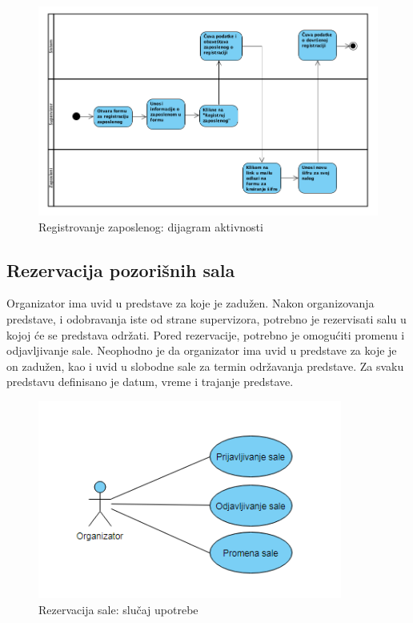 \documentclass[a4paper]{article}
\begin{document}
\begin{figure}[H]
  \begin{center}
      \includegraphics[width=160mm]{../images/dijagram_aktivnosti_registrovanje_zaposlenog.png}
  \end{center}
  \caption{Registrovanje zaposlenog: dijagram aktivnosti}
  \label{dijagram_aktivnosti_registrovanje_zaposlenog}
\end{figure}



\subsection{Rezervacija pozorišnih sala}
Organizator ima uvid u predstave za koje je zadužen. Nakon organizovanja predstave, i odobravanja iste od strane supervizora, potrebno je rezervisati salu u kojoj će se predstava održati. Pored rezervacije, potrebno je omogućiti  promenu i odjavljivanje sale. Neophodno je da organizator ima uvid u predstave za koje je on zadužen, kao i uvid u slobodne sale za termin održavanja predstave. Za svaku predstavu definisano je datum, vreme i trajanje predstave.

\begin{figure}[H]
  \begin{center}
      \includegraphics[width=100mm]{../images/usecase_rezervacija_sale.png}
  \end{center}
  \caption{Rezervacija sale: slučaj upotrebe}
  \label{usecase_rezervacija_sale}
\end{figure}
\end{document}
